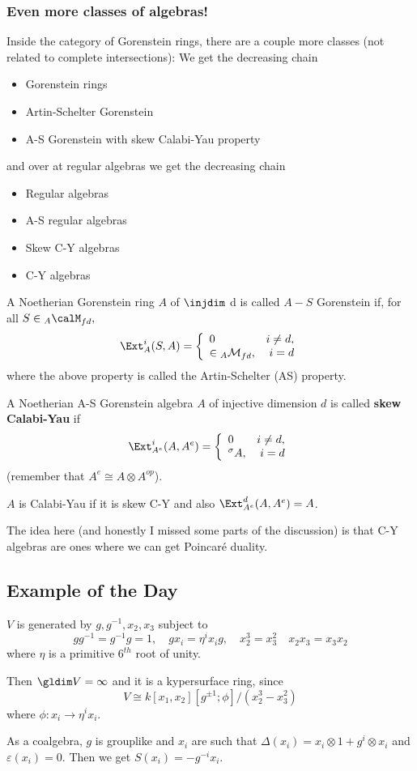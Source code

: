 \documentclass[12pt]{article}
\begin{document}
\subsubsection{Even more classes of algebras!}
Inside the category of Gorenstein rings, there are a couple more classes (not related to complete intersections):
We get the decreasing chain
\begin{itemize}
	\item Gorenstein rings
	\item Artin-Schelter Gorenstein
	\item A-S Gorenstein with skew Calabi-Yau property
\end{itemize}
and over at regular algebras we get the decreasing chain
\begin{itemize}
	\item Regular algebras
	\item A-S regular algebras
	\item Skew C-Y algebras
	\item C-Y algebras
\end{itemize}
\begin{defn}
	A Noetherian Gorenstein ring $A$ of $\injdim$ d is called $A-S$ Gorenstein if, for all $S\in{_A\calM}_{fd},$
	\[\Ext_A^i(S,A)=\left\{\begin{array}{lr}0 & i\ne d,\\ \in {_A\cal M}_{fd}, & i=d\end{array}\right.\]
	where the above property is called the Artin-Schelter (AS) property.
\end{defn}
\begin{defn}
	A Noetherian A-S Gorenstein algebra $A$ of injective dimension $d$ is called \textbf{skew Calabi-Yau} if
	\[\Ext_{A^e}^i(A,A^e)=\left\{\begin{array}{lr}0 & i\ne d,\\ {^\sigma A}, & i=d\end{array}\right.\]
	(remember that $A^e\cong A\otimes A^{op}$).
\end{defn}
\begin{defn}
	$A$ is Calabi-Yau if it is skew C-Y and also $\Ext_{A^e}^d(A,A^e)=A$.
\end{defn}
\begin{rmk}
	The idea here (and honestly I missed some parts of the discussion) is that C-Y algebras are ones where we can get 
	Poincar\'e duality.
\end{rmk}
\subsection{Example of the Day}
\begin{ex}
	$V$ is generated by $g,g^{-1},x_2,x_3$ subject to
	\[gg^{-1}=g^{-1}g=1,\quad gx_i=\eta^ix_i g,\quad x_2^3=x_3^2\quad x_2x_3=x_3x_2\]
	where $\eta$ is a primitive $6^{th}$ root of unity.

	Then $\gldim V=\infty$ and it is a kypersurface ring, since
	\[V\cong k[x_1,x_2][g^{\pm 1};\phi]/(x_2^3-x_3^2)\]
	where $\phi:x_i\to \eta^ix_i$.

	As a coalgebra, $g$ is grouplike and $x_i$ are such that $\Delta(x_i)=x_i\otimes 1+g^i\otimes x_i$
	and $\varepsilon(x_i)=0$. Then we get $S(x_i)=-g^{-i}x_i.$
\end{ex}
\end{document}
